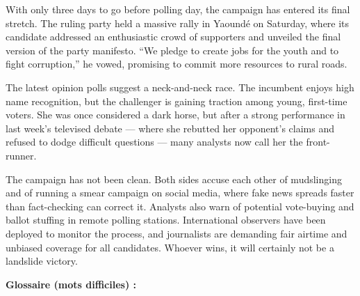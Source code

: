 \documentclass[11pt]{article}
\begin{document}
\begin{textebox}
With only three days to go before polling day, the campaign has entered its final stretch. The ruling party held a massive rally in Yaoundé on Saturday, where its candidate addressed an enthusiastic crowd of supporters and unveiled the final version of the party manifesto. “We pledge to create jobs for the youth and to fight corruption,” he vowed, promising to commit more resources to rural roads.

The latest opinion polls suggest a neck-and-neck race. The incumbent enjoys high name recognition, but the challenger is gaining traction among young, first-time voters. She was once considered a dark horse, but after a strong performance in last week's televised debate — where she rebutted her opponent's claims and refused to dodge difficult questions — many analysts now call her the front-runner.

The campaign has not been clean. Both sides accuse each other of mudslinging and of running a smear campaign on social media, where fake news spreads faster than fact-checking can correct it. Analysts also warn of potential vote-buying and ballot stuffing in remote polling stations. International observers have been deployed to monitor the process, and journalists are demanding fair airtime and unbiased coverage for all candidates. Whoever wins, it will certainly not be a landslide victory.
\end{textebox}

\textbf{Glossaire (mots difficiles) :}
\end{document}
